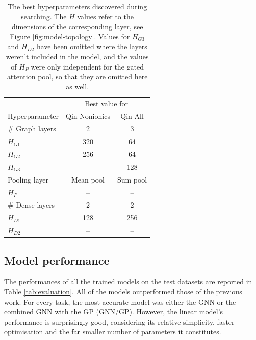 \begin{table}
    \centering
    \caption{The best hyperparameters discovered during searching. The $H$
        values refer to the dimensions of the corresponding layer, see Figure
        \ref{fig:model-topology}. Values for $H_{G3}$ and $H_{D2}$ have been
        omitted where the layers weren't included in the model, and the values
        of $H_P$ were only independent for the gated attention pool, so that
        they are omitted here as well.}
    \label{tab:hb-hps}
    \begin{tabular}{@{}lcc@{}} \toprule
                        & \multicolumn{2}{c}{Best value for}            \\\cmidrule(l){2-3}
        Hyperparameter  & Qin-Nonionics                      & Qin-All  \\\midrule
        \# Graph layers & 2                                  & 3        \\
        $H_{G1}$        & 320                                & 64       \\
        $H_{G2}$        & 256                                & 64       \\
        $H_{G3}$        & --                                 & 128      \\
        Pooling layer   & Mean pool                          & Sum pool \\
        $H_P$           & --                                 & --       \\
        \# Dense layers & 2                                  & 2        \\
        $H_{D1}$        & 128                                & 256      \\
        $H_{D2}$        & --                                 & --       \\\bottomrule
    \end{tabular}
\end{table}

\subsection{Model performance}

The performances of all the trained models on the test datasets are reported in Table \ref{tab:evaluation}. All of the models outperformed those of the previous work. For every task, the most accurate model was either the GNN or the combined GNN with the GP (GNN/GP). However, the linear model's performance is surprisingly good, considering its relative simplicity, faster optimisation and the far smaller number of parameters it constitutes.

